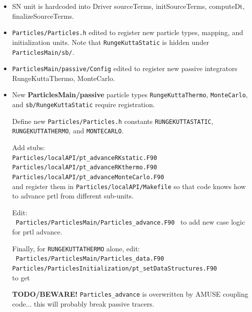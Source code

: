 \documentclass[10pt]{article}
\begin{document}
\begin{itemize}

    \item SN unit is hardcoded into Driver sourceTerms, initSourceTerms, computeDt,
          finalizeSourceTerms.

      \item \texttt{Particles/Particles.h} edited to register new particle
          types, mapping, and initialization units. Note that
          \texttt{RungeKuttaStatic} is hidden under
          \texttt{ParticlesMain/sb/}.

    \item \texttt{ParticlesMain/passive/Config} edited to register new passive
        integrators RungeKuttaThermo, MonteCarlo.

    \item New \textbf{ParticlesMain/passive} particle types \texttt{RungeKuttaThermo},
        \texttt{MonteCarlo}, and \texttt{sb/RungeKuttaStatic} require
        registration.

        Define new \texttt{Particles/Particles.h} constants
        \texttt{RUNGEKUTTASTATIC}, \texttt{RUNGEKUTTATHERMO}, and
        \texttt{MONTECARLO}.

        Add stubs: \\
        \texttt{Particles/localAPI/pt\_advanceRKstatic.F90 \\
                Particles/localAPI/pt\_advanceRKthermo.F90 \\
                Particles/localAPI/pt\_advanceMonteCarlo.F90
        } \\
        and register them in \texttt{Particles/localAPI/Makefile} so that code
        knows how to advance prtl from different sub-units.

        Edit: \\
        \texttt{
            Particles/ParticlesMain/Particles\_advance.F90
        }
        to add new case logic for prtl advance.

        Finally, for \texttt{RUNGEKUTTATHERMO} alone, edit: \\
        \texttt{
            Particles/ParticlesMain/Particles\_data.F90 \\
            Particles/ParticlesInitialization/pt\_setDataStructures.F90
        } \\
        to get

        \textbf{TODO/BEWARE!} \texttt{Particles\_advance} is overwritten by
        AMUSE coupling code... this will probably break passive tracers.



\end{itemize}
\end{document}
